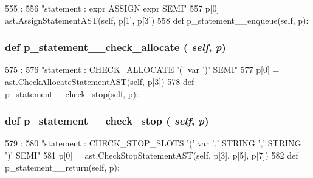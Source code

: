\begin{DoxyVerb}
\begin{DoxyCode}
555                                     :
556         "statement : expr ASSIGN expr SEMI"
557         p[0] = ast.AssignStatementAST(self, p[1], p[3])
558 
    def p_statement__enqueue(self, p):
\end{DoxyCode}
\hypertarget{classslicc_1_1parser_1_1SLICC_a34a751b0b1ff323ed683da56c391c461}{
\subsubsection[{p\_\-statement\_\-\_\-check\_\-allocate}]{\setlength{\rightskip}{0pt plus 5cm}def p\_\-statement\_\-\_\-check\_\-allocate ( {\em self}, \/   {\em p})}}
\label{classslicc_1_1parser_1_1SLICC_a34a751b0b1ff323ed683da56c391c461}



\begin{DoxyCode}
575                                             :
576         "statement : CHECK_ALLOCATE '(' var ')' SEMI"
577         p[0] = ast.CheckAllocateStatementAST(self, p[3])
578 
    def p_statement__check_stop(self, p):
\end{DoxyCode}
\hypertarget{classslicc_1_1parser_1_1SLICC_a61a8619e79455f83956fe1eb357b5b7f}{
\subsubsection[{p\_\-statement\_\-\_\-check\_\-stop}]{\setlength{\rightskip}{0pt plus 5cm}def p\_\-statement\_\-\_\-check\_\-stop ( {\em self}, \/   {\em p})}}
\label{classslicc_1_1parser_1_1SLICC_a61a8619e79455f83956fe1eb357b5b7f}



\begin{DoxyCode}
579                                         :
580         "statement : CHECK_STOP_SLOTS '(' var ',' STRING ',' STRING ')' SEMI"
581         p[0] = ast.CheckStopStatementAST(self, p[3], p[5], p[7])
582 
    def p_statement__return(self, p):
\end{DoxyCode}
\hypertarget{classslicc_1_1parser_1_1SLICC_aa24de70d62c542b3a2c70537e8d9c545}{
}
\end{DoxyVerb}
